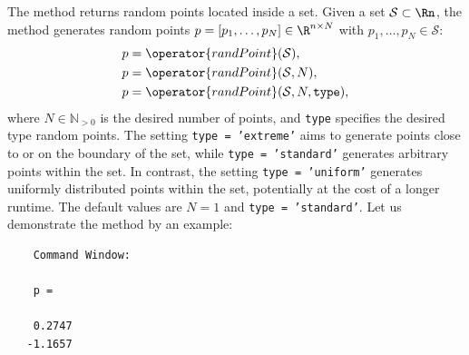 
The method  returns random points located inside a set. Given a set $\mathcal{S} \subset \Rn$, the method  generates random points $p = [p_1,\dots,p_N] \in \R^{n \times N}$ with $p_1,\dots, p_N \in \mathcal{S}$:
\begin{equation*}
	\begin{split}
		& p = \operator{randPoint}(\mathcal{S}), \\
		& p = \operator{randPoint}(\mathcal{S},N), \\
		& p = \operator{randPoint}(\mathcal{S},N,\texttt{type}),
   \end{split}
\end{equation*}
where $N \in \mathbb{N}_{> 0}$ is the desired number of points, and \texttt{type} specifies the desired type random points. The setting \texttt{type = 'extreme'} aims to generate points close to or on the boundary of the set, while \texttt{type = 'standard'} generates arbitrary points within the set. In contrast, the setting \texttt{type = 'uniform'} generates uniformly distributed points within the set, potentially at the cost of a longer runtime. The default values are $N = 1$ and \texttt{type = 'standard'}. Let us demonstrate the method  by an example:

\begin{center}
\begin{minipage}[t]{0.40\textwidth}
	\vspace{10pt}
	\footnotesize
	
\end{minipage}
\begin{minipage}[t]{0.2\textwidth}
	\vspace{10pt}

	\begin{verbatim}
	Command Window:
		
	p =

    0.2747
   -1.1657
	\end{verbatim}
\end{minipage}
\begin{minipage}[t]{0.3\textwidth}
	\vspace{0pt}
	\centering
\end{minipage}
\end{center}

\vspace{1cm}

